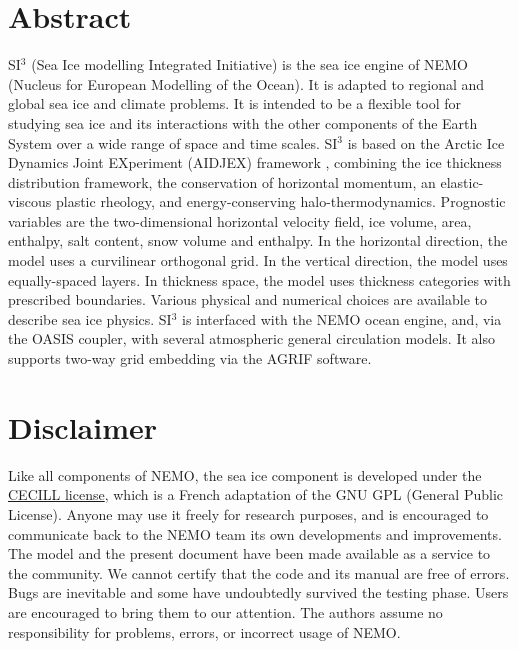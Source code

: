 \documentclass[../../tex_main/NEMO_manual]{subfiles}
\begin{document}

\chapter*{Abstract}

SI$^3$ (Sea Ice modelling Integrated Initiative) is the sea ice engine of NEMO (Nucleus for European Modelling of the Ocean). It is adapted to regional and global sea ice and climate problems. It is intended to be a flexible tool for studying sea ice and its interactions with the other components of the Earth System over a wide range of space and time scales. SI$^3$ is based on the Arctic Ice Dynamics Joint EXperiment (AIDJEX) framework \citep{Coonetal74}, combining the ice thickness distribution framework, the conservation of horizontal momentum, an elastic-viscous plastic rheology, and energy-conserving halo-thermodynamics. Prognostic variables are the two-dimensional horizontal velocity field, ice volume, area, enthalpy, salt content, snow volume and enthalpy. In the horizontal direction, the model uses a curvilinear orthogonal grid. In the vertical direction, the model uses equally-spaced layers. In thickness space, the model uses thickness categories with prescribed boundaries. Various physical and numerical choices are available to describe sea ice physics. SI$^3$ is interfaced with the NEMO ocean engine, and, via the OASIS coupler, with several atmospheric general circulation models. It also supports two-way grid embedding via the AGRIF software.


{\small
} 

\chapter*{Disclaimer}

Like all components of NEMO, the sea ice component is developed under the \href{http://www.cecill.info/}{CECILL license}, 
which is a French adaptation of the GNU GPL (General Public License). Anyone may use it 
freely for research purposes, and is encouraged to communicate back to the NEMO team 
its own developments and improvements. The model and the present document have been 
made available as a service to the community. We cannot certify that the code and its manual 
are free of errors. Bugs are inevitable and some have undoubtedly survived the testing phase. 
Users are encouraged to bring them to our attention. The authors assume no responsibility 
for problems, errors, or incorrect usage of NEMO.
\end{document}
